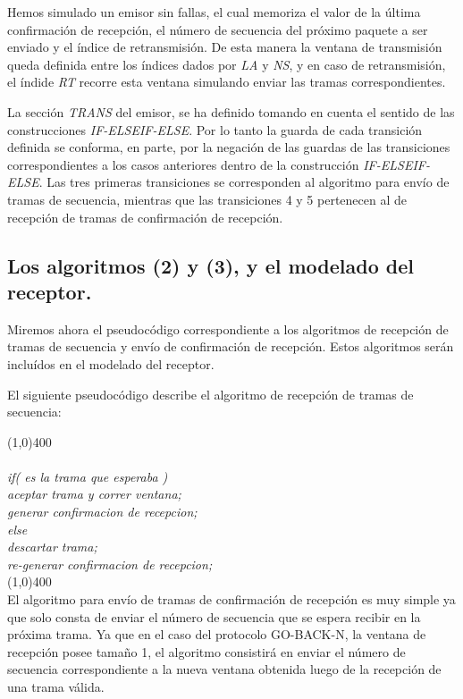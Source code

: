 \documentclass[titlepage, 12pt]{book}
\begin{document}
Hemos simulado un emisor sin fallas, el cual memoriza el valor de la \'ultima confirmaci\'on de recepci\'on, el n\'umero de secuencia del pr\'oximo paquete a ser enviado y el \'indice de retransmisi\'on. De esta manera la ventana de transmisi\'on queda definida entre los \'indices dados por \textit{LA} y \textit{NS}, y en caso de retransmisi\'on, el \'indide \textit{RT} recorre esta ventana simulando enviar las tramas correspondientes.

La secci\'on \textit{TRANS} del emisor, se ha definido tomando en cuenta el sentido de las construcciones \textit{IF-ELSEIF-ELSE}. Por lo tanto la guarda de cada transici\'on definida se conforma, en parte, por la negaci\'on de las guardas de las transiciones correspondientes a los casos anteriores dentro de la construcci\'on \textit{IF-ELSEIF-ELSE}. Las tres primeras transiciones se corresponden al algoritmo para env\'io de tramas de secuencia, mientras que las transiciones 4 y 5 pertenecen al de recepci\'on de tramas de confirmaci\'on de recepci\'on.



\subsection*{Los algoritmos (2) y (3), y el modelado del receptor.}


Miremos ahora el pseudoc\'odigo correspondiente a los algoritmos de recepci\'on de tramas de secuencia y env\'io de confirmaci\'on de recepci\'on. Estos algoritmos ser\'an inclu\'idos en el modelado del receptor.

El siguiente pseudoc\'odigo describe el algoritmo de recepci\'on de tramas de secuencia:

\noindent \line(1,0){400}
\textit{\\\\
if( es la trama que esperaba )\\
\indent    aceptar trama y correr ventana;\\
\indent    generar confirmacion de recepcion;\\
else\\
\indent    descartar trama;\\
\indent    re-generar confirmacion de recepcion;\\
}
\noindent \line(1,0){400}\\

El algoritmo para env\'io de tramas de confirmaci\'on de recepci\'on es muy simple ya que solo consta de enviar el n\'umero de secuencia que se espera recibir en la pr\'oxima trama. Ya que en el caso del protocolo GO-BACK-N, la ventana de recepci\'on posee tama\~no 1, el algoritmo consistir\'a en enviar el n\'umero de secuencia correspondiente a la nueva ventana obtenida luego de la recepci\'on de una trama v\'alida.
\end{document}
